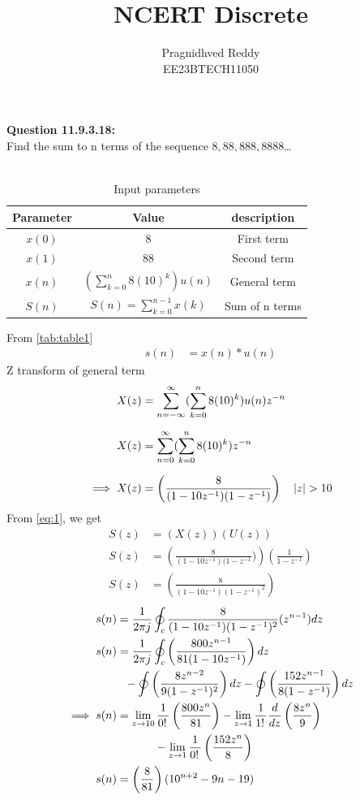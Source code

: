\documentclass[journal,12pt,twocolumn]{IEEEtran}
\title{NCERT Discrete}
\author{Pragnidhved Reddy\\EE23BTECH11050}
\date{}
\begin{document}
\maketitle
\newpage
\bigskip
\textbf{Question 11.9.3.18:}\\
 Find the sum to n terms of the sequence $8,88,888,8888$\ldots\\
 \solution \\
 \begin{table}[H]
\centering
\setlength{\extrarowheight}{8pt}
\begin{tabular}{|c|c|c|}\hline
\textbf{Parameter} & \textbf{Value} & \textbf{description}\\ \hline
$x(0)$ & 8 & First term \\ \hline
$x(1)$ & 88 & Second term \\ \hline 
$x(n)$ & $(\sum^{n}_{k=0}8(10)^k)u(n)$ & General term \\ \hline
$S(n)$ & $S(n)=\sum^{n-1}_{k=0}x(k)$ & Sum of n terms \\ \hline
\end{tabular}
\caption{Input parameters}
\label{tab:table1}
\end{table}
 From \eqref{tab:table1}
\begin{align}
\label{eq:1}
 s(n)&=x(n)* u(n)
 \end{align}
 Z transform of general term
 \begin{align}
 X(z)&=\sum_{n=-\infty}^{\infty}(\sum_{k=0}^{n}8(10)^k)u(n)z^{-n}\\[6pt]
 X(z)&=\sum_{n=0}^{\infty}(\sum_{k=0}^{n}8(10)^k)z^{-n}\\[6pt]
 \implies X(z)&=\left(\frac{8}{(1-10z^{-1})(1-z^{-1})}\right) \quad \left\vert z\right\vert>10
\end{align}
From \eqref{eq:1}, we get
 \begin{align}
 S(z)&=(X(z))(U(z))\\
 S(z)&=\left(\frac{8}{(1-10z^{-1})(1-z^{-1}})\right)\left(\frac{1}{1-z^{-1}}\right)\\[6pt]
 S(z)&=\left(\frac{8}{(1-10z^{-1})(1-z^{-1})^2}\right)
\end{align}
\begin{align}
 s(n)&=\frac{1}{2\pi j}\oint_{c}\frac{8}{(1-10z^{-1})(1-z^{-1})^2}(z^{n-1})dz\\
\notag s(n)&=\frac{1}{2\pi j} \oint_{c} \left(\frac{800z^{n-1}}{81(1-10z^{-1})}\right)dz\\ &~~-
\oint \left(\frac{8z^{n-2}}{9(1-z^{-1})^2}\right)dz-\oint \left(\frac{152z^{n-1}}{8(1-z^{-1})} \right)dz\\
\notag \implies s(n)&=\lim_{z\to10}\frac{1}{0\displaystyle !\,}\left(\frac{800z^n}{81}\right)-\lim_{z\to1}\frac{1}{1\displaystyle !\,}\frac{d}{dz}\left(\frac{8z^n}{9}\right)\\ &~~~~~~~~~~-\lim_{z\to1}\frac{1}{0\displaystyle !\,}\left(\frac{152z^n}{8}\right)\\
 s(n)&=\left(\frac{8}{81}\right)(10^{n+2}-9n-19)   
\end{align}
\end{document}
